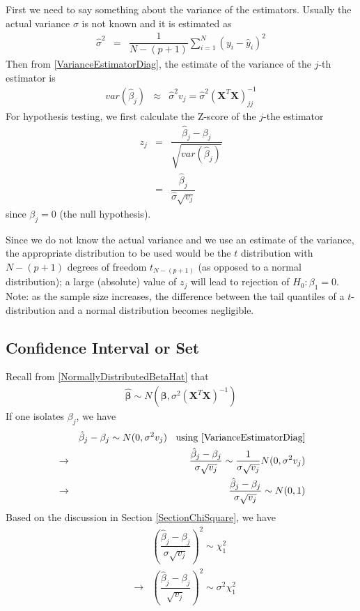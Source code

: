 \documentclass[11pt]{article}
\theoremstyle{remark}
\begin{document}
First we need to say something about the variance of the estimators. Usually the actual variance $\sigma$ is not known and it is estimated as
\begin{eqnarray}
\hat{\sigma}^2 &=&\dfrac{1}{N-(p+1)}\sum_{i=1}^N(y_i-\hat{y}_i)^2
\end{eqnarray}
Then from \eqref{VarianceEstimatorDiag}, the estimate of the variance of the $j$-th estimator is
\begin{eqnarray}
var(\hat{\beta}_j) &\approx& \hat{\sigma}^2 v_j = \hat{\sigma}^2 \left(\mathbf{X}^T\mathbf{X}\right)^{-1}_{jj}\label{VarianceEstimatorDiagEstimate}
\end{eqnarray}
For hypothesis testing, we first calculate the Z-score of the $j$-the estimator
\begin{eqnarray}
z_j &=&\dfrac{\hat{\beta}_j - \beta_j}{\sqrt{var(\hat{\beta}_j)}}\nonumber\\
&=&\dfrac{\hat{\beta}_j}{\hat{\sigma} \sqrt{v_j}}
\end{eqnarray}
since $\beta_j = 0$ (the null hypothesis).

Since we do not know the actual variance and we use an estimate of the variance, the appropriate distribution to be used would be the $t$ distribution with $N-(p+1)$ degrees of freedom $t_{N-(p+1)}$ (as opposed to a normal distribution); a large (absolute) value of $z_j$ will lead to rejection of $H_0: \beta_1 = 0$. Note: as the sample size increases, the difference between the tail quantiles of a $t$-distribution and a normal distribution becomes negligible.


\subsection{Confidence Interval or Set}
Recall from \eqref{NormallyDistributedBetaHat} that
\begin{eqnarray}
\boldsymbol{\hat{\beta}}\sim N(\boldsymbol{\beta},\sigma^2 \left(\mathbf{X}^T\mathbf{X}\right)^{-1})
\end{eqnarray}
If one isolates $\beta_j$, we have
\begin{eqnarray}
&&\hat{\beta}_j - \beta_j \sim N(0,\sigma^2 v_j )\:\:\:\:\text{using \eqref{VarianceEstimatorDiag}}\nonumber\\
&\rightarrow&\dfrac{\hat{\beta}_j - \beta_j}{\sigma \sqrt{v_j}} \sim \dfrac{1}{\sigma \sqrt{v_j}}N(0,\sigma^2 v_j )\nonumber\\
&\rightarrow&\dfrac{\hat{\beta}_j - \beta_j}{\sigma \sqrt{v_j}} \sim N(0,1)
\end{eqnarray}
Based on the discussion in Section \ref{SectionChiSquare}, we have
\begin{eqnarray}
&&\left(\dfrac{\hat{\beta}_j - \beta_j}{\sigma \sqrt{v_j}}\right)^2 \sim \chi_1^2\nonumber\\
&\rightarrow&\left(\dfrac{\hat{\beta}_j - \beta_j}{\sqrt{v_j}}\right)^2 \sim \sigma^2\chi_1^2
\end{eqnarray}


\end{document}

